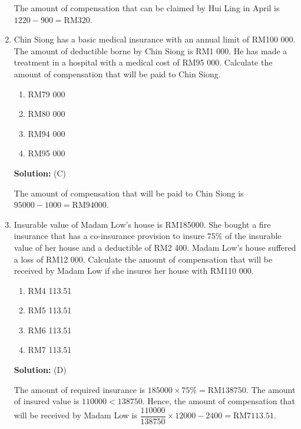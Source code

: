 \documentclass{report}
\newcommand{\sol}{

    \vspace{0.5em}\textbf{Solution:}\vspace{0.5em}}
\begin{document}
\begin{enumerate}
          The amount of compensation that can be claimed by Hui Ling in April is $1 220 -
              900 = \text{RM} 320$. \vspace{0.5cm}

    \item Chin Siong has a basic medical insurance with an annual limit of RM100 000. The
          amount of deductible borne by Chin Siong is RM1 000. He has made a treatment in
          a hospital with a medical cost of RM95 000. Calculate the amount of
          compensation that will be paid to Chin Siong.
          \begin{enumerate}[label=(\Alph*)]
              \item RM79 000
              \item RM80 000
              \item RM94 000
              \item RM95 000
          \end{enumerate}
          \sol{} (C)

          The amount of compensation that will be paid to Chin Siong is $95 000 - 1 000 =
              \text{RM} 94 000$. \vspace{0.5cm}

          \newpage
    \item Insurable value of Madam Low's house is RM185000. She bought a fire insurance
          that has a co-insurance provision to insure $75 \%$ of the insurable value of
          her house and a deductible of RM2 400. Madam Low's house suffered a loss of
          RM12 000. Calculate the amount of compensation that will be received by Madam
          Low if she insures her house with RM110 000.
          \begin{enumerate}[label=(\Alph*)]
              \item RM4 113.51
              \item RM5 113.51
              \item RM6 113.51
              \item RM7 113.51
          \end{enumerate}
          \sol{} (D)

          The amount of required insurance is $185 000 \times 75 \% = \text{RM} 138 750$.
          The amount of insured value is $110 000 < 138 750$. Hence, the amount of
          compensation that will be received by Madam Low is $\dfrac{110 000}{138 750}
              \times 12 000 - 2 400 = \text{RM} 7 113.51$. \vspace{0.5cm}


\end{enumerate}
\end{document}
